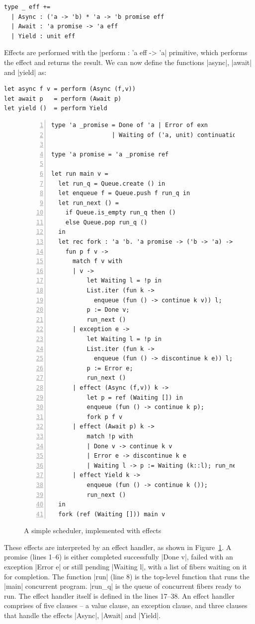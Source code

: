\documentclass{llncs}
\begin{document}
\begin{lstlisting}
type _ eff +=
  | Async : ('a -> 'b) * 'a -> 'b promise eff
  | Await : 'a promise -> 'a eff
  | Yield : unit eff
\end{lstlisting}

Effects are performed with the |perform : 'a eff -> 'a| primitive, which
performs the effect and returns the result. We can now define the functions
|async|, |await| and |yield| as:

\begin{lstlisting}
let async f v = perform (Async (f,v))
let await p   = perform (Await p)
let yield ()  = perform Yield
\end{lstlisting}


\begin{figure}
\begin{lstlisting}[numbers=left,numbersep=5pt,numberstyle=\sffamily\tiny]
type 'a _promise = Done of 'a | Error of exn
                 | Waiting of ('a, unit) continuation list

type 'a promise = 'a _promise ref

let run main v =
  let run_q = Queue.create () in
  let enqueue f = Queue.push f run_q in
  let run_next () =
    if Queue.is_empty run_q then ()
    else Queue.pop run_q ()
  in
  let rec fork : 'a 'b. 'a promise -> ('b -> 'a) -> 'b -> unit =
    fun p f v ->
      match f v with
      | v ->
          let Waiting l = !p in
          List.iter (fun k ->
            enqueue (fun () -> continue k v)) l;
          p := Done v;
          run_next ()
      | exception e ->
          let Waiting l = !p in
          List.iter (fun k ->
            enqueue (fun () -> discontinue k e)) l;
          p := Error e;
          run_next ()
      | effect (Async (f,v)) k ->
          let p = ref (Waiting []) in
          enqueue (fun () -> continue k p);
          fork p f v
      | effect (Await p) k ->
          match !p with
          | Done v -> continue k v
          | Error e -> discontinue k e
          | Waiting l -> p := Waiting (k::l); run_next ()
      | effect Yield k ->
          enqueue (fun () -> continue k ());
          run_next ()
  in
  fork (ref (Waiting [])) main v
\end{lstlisting}
\caption{A simple scheduler, implemented with effects}
\label{fig:scheduler}
\end{figure}

These effects are interpreted by an effect handler, as shown in
Figure~\ref{fig:scheduler}. A promise (lines 1--6) is either completed
successfully |Done v|, failed with an exception |Error e| or still pending
|Waiting l|, with a list of fibers waiting on it for completion. The function
|run| (line 8) is the top-level function that runs the |main| concurrent
program. |run_q| is the queue of concurrent fibers ready to run. The effect
handler itself is defined in the lines 17--38. An effect handler comprises of
five clauses -- a value clause, an exception clause, and three clauses that
handle the effects |Async|, |Await| and |Yield|.
\end{document}
